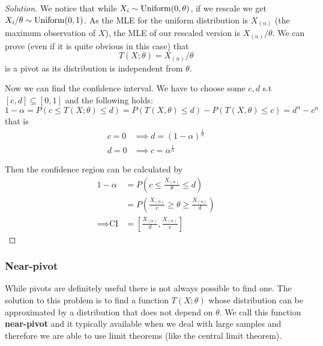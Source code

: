 \documentclass[12pt]{extarticle}
\newcommand{\Uniform}{{\operatorfont Uniform}}
\begin{document}
\begin{proof}[Solution]
    We notice that while $X_i \sim \Uniform(0, \theta)$, if we rescale we get $X_i/ \theta \sim \Uniform(0,1)$.
    As the MLE for the uniform distribution is $X_{(n)}$ (the maximum observation of $X$), the MLE of our rescaled version is $X_{(n)} / \theta$.
    We can prove (even if it is quite obvious in this case) that
    \begin{equation}
        T(X; \theta) = X_{(n)} / \theta
    \end{equation}
    is a pivot as its distribution is independent from $\theta$.

    Now we can find the confidence interval.
    We have to choose some $c, d$ s.t $[c, d] \subseteq [0, 1]$ and the following holds:
    \begin{equation}
        1 - \alpha =  P(c \leq T(X; \theta) \leq d) = P (T(X, \theta) \leq d) - P (T(X, \theta) \leq c) = d^n - c^n
    \end{equation}
    that is
    \begin{align}
        c = 0 & \implies d = (1- \alpha)^{\frac{1}{n}} \\
        d = 0 & \implies c = \alpha^{\frac{1}{n}}
    \end{align}

    Then the confidence region can be calculated by
    \begin{align}
        1 - \alpha         & = P\left(c \leq \frac{X_{(n)}}{\theta} \leq d\right)                  \\
                           & = P\left(\frac{X_{(n)}}{c} \geq \theta \geq \frac{X_{(n)}}{d} \right) \\
        \implies \text{CI} & = \left[ \frac{X_{(n)}}{d}, \frac{X_{(n)}}{c} \right]
    \end{align}
\end{proof}

\subsubsection{Near-pivot}

While pivots are definitely useful there is not always possible to find one.
The solution to this problem is to find a function $T(X; \theta)$ whose distribution can be approximated by a distribution that does not depend on $\theta$.
We call this function \textbf{near-pivot} and it typically available when we deal with large samples and therefore we are able to use limit theorems (like the central limit theorem).
\end{document}
